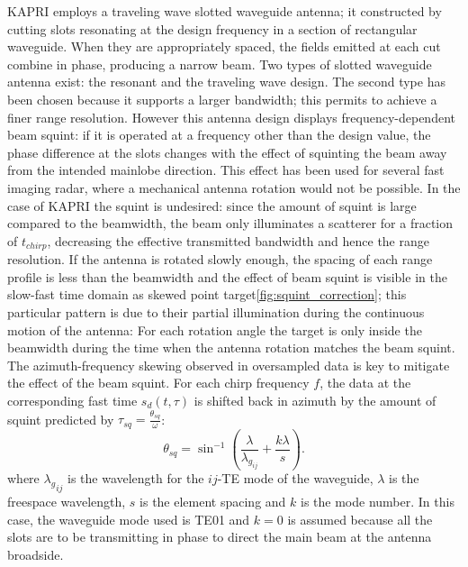 KAPRI employs a traveling wave slotted waveguide antenna\cite{Hines1953a,Granet2007}; it constructed by cutting slots resonating at the design frequency in a section of rectangular waveguide. When they are appropriately spaced, the fields emitted at each cut combine in phase, producing a narrow beam. Two types of slotted waveguide antenna exist\cite{Enjiu2013}: the resonant and the traveling wave design. The second type has been chosen because it supports a larger bandwidth; this permits to achieve a finer range resolution. However this antenna design displays frequency-dependent beam squint: if it is operated at a frequency other than the design value, the phase difference at the slots changes with the effect of squinting the beam away from the intended mainlobe direction. This effect has been used for several fast imaging radar, where a mechanical antenna rotation would not be possible\cite{Yang2014,Yang2012,Mayer2003,Alvarez2013}. In the case of KAPRI the squint is undesired: since the amount of squint is large compared to the beamwidth, the beam only illuminates a scatterer for a fraction of $t_{chirp}$, decreasing the effective transmitted bandwidth and hence the range resolution.  If the antenna is rotated slowly enough,  the spacing of each range profile is less than the beamwidth and the effect of beam squint is visible in the slow-fast time domain as skewed point target\autoref{fig:squint_correction}; this particular pattern is due to their partial illumination during the continuous motion of the antenna: For each rotation angle the target is only inside the beamwidth during the time when the antenna rotation matches the beam squint. 
The azimuth-frequency skewing observed in oversampled data is key to mitigate the effect of the beam squint. For each chirp frequency $f$, the data at the corresponding fast time $s_{d}\left(t,\tau\right)$ is shifted back in azimuth by the amount of squint predicted by $\tau_{sq}=\frac{\theta_{sq}}{\omega}$:
\begin{equation}\label{eq:squint_exact}
	\theta_{sq} = \sin^{-1}\left(\frac{\lambda}{\lambda_{g_{ij}}} + \frac{k \lambda}{s}\right).
\end{equation}
where ${\lambda_g}_{ij}$ is the wavelength for the $ij$-TE mode of the waveguide, $\lambda$ is the freespace wavelength, $s$ is the element spacing and $k$ is the mode number. In this case, the waveguide mode used is TE01 and $k=0$ is assumed because all the slots are to be transmitting in phase\cite{kraus88} to direct the main beam at the antenna broadside.\\

